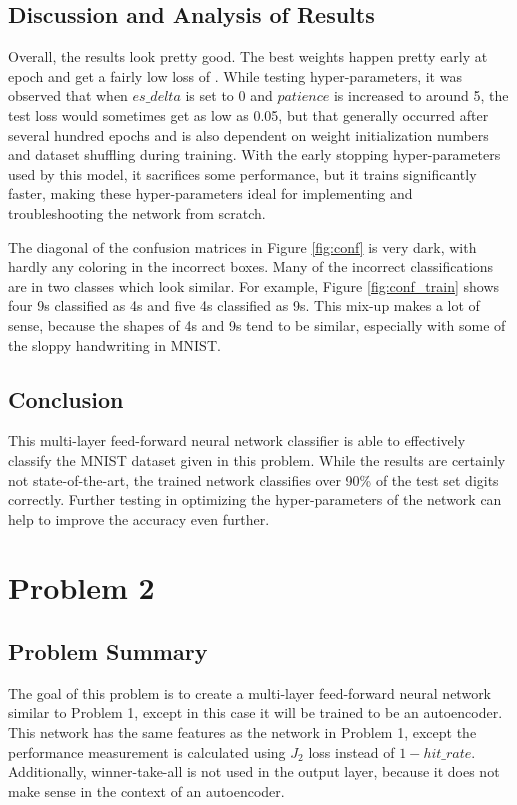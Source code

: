 \documentclass[a4paper, 12pt, titlepage]{article}
\newcommand{\figRef}[1]{Figure \ref{#1}}
\begin{document}
  \subsection{Discussion and Analysis of Results}
  \par Overall, the results look pretty good.
  The best weights happen pretty early at epoch
  \unskip{} and get a fairly low loss of
  \unskip{}.
  While testing hyper-parameters, it was observed that when $es\_delta$ is set
  to 0 and $patience$ is increased to around 5, the test loss would sometimes
  get as low as 0.05, but that generally occurred after several hundred epochs
  and is also dependent on weight initialization numbers and dataset shuffling
  during training.
  With the early stopping hyper-parameters used by this model, it sacrifices
  some performance, but it trains significantly faster, making these
  hyper-parameters ideal for implementing and troubleshooting the network from
  scratch.
  \par The diagonal of the confusion matrices in \figRef{fig:conf} is very
  dark, with hardly any coloring in the incorrect boxes.
  Many of the incorrect classifications are in two classes which look similar.
  For example, \figRef{fig:conf_train} shows four 9s classified as 4s and five
  4s classified as 9s.
  This mix-up makes a lot of sense, because the shapes of 4s and 9s tend to be
  similar, especially with some of the sloppy handwriting in MNIST.

  \subsection{Conclusion}
  \par This multi-layer feed-forward neural network classifier is able to
  effectively classify the MNIST dataset given in this problem.
  While the results are certainly not state-of-the-art, the trained network
  classifies over 90\% of the test set digits correctly.
  Further testing in optimizing the hyper-parameters of the network can help to
  improve the accuracy even further.

  \pagebreak
  \section{Problem 2}
  \subsection{Problem Summary}
  \par The goal of this problem is to create a multi-layer feed-forward neural
  network similar to Problem 1, except in this case it will be trained to be an
  autoencoder.
  This network has the same features as the network in Problem 1, except the
  performance measurement is calculated using $J_{2}$ loss instead of
  $1 - hit\_rate$.
  Additionally, winner-take-all is not used in the output layer, because it
  does not make sense in the context of an autoencoder.
\end{document}
